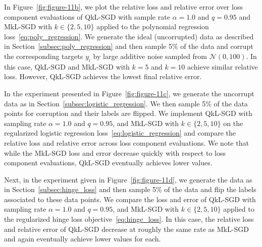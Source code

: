 \documentclass[11pt]{article}
\begin{document}
In Figure~\ref{fig:figure-11b}, we plot the relative loss and relative error over loss component evaluations of QkL-SGD with sample rate $\alpha = 1.0$ and $q = 0.95$ and MkL-SGD with $k \in \{2, 5, 10\}$ applied to the polynomial regression loss~\eqref{eq:poly_regression}.  We generate the ideal (uncorrupted) data as described in Section~\ref{subsec:poly_regression} and then sample 5\% of the data and corrupt the corresponding targets $y_i$ by large additive noise sampled from $\mathcal{N}(0,100)$. In this case, QkL-SGD and MkL-SGD with $k = 5$ and $k=10$ achieve similar relative loss.  However, QkL-SGD achieves the lowest final relative error.


In the experiment presented in Figure~\ref{fig:figure-11c}, we generate the uncorrupt data as in Section~\ref{subsec:logistic_regression}.  We then sample 5\% of the data points for corruption and their labels are flipped.  We implement QkL-SGD with sampling rate $\alpha = 1.0$ and $q = 0.95$, and MkL-SGD with $k \in \{2, 5, 10\}$ on the regularized logistic regression loss~\eqref{eq:logistic_regression} and compare the relative loss and relative error across loss component evaluations.  We note that while the MkL-SGD loss and error decrease quickly with respect to loss component evaluations, QkL-SGD eventually achieves lower values.


Next, in the experiment given in Figure~\ref{fig:figure-11d}, we generate the data as in Section~\ref{subsec:hinge_loss} and then sample 5\% of the data and flip the labels associated to these data points.  We compare the loss and error of QkL-SGD with sampling rate $\alpha = 1.0$ and $q = 0.95$, and MkL-SGD with $k \in \{2, 5, 10\}$ applied to the regularized hinge loss objective~\eqref{eq:hinge_loss}.  In this case, the relative loss and relative error of QkL-SGD decrease at roughly the same rate as MkL-SGD and again eventually achieve lower values for each.
\end{document}
